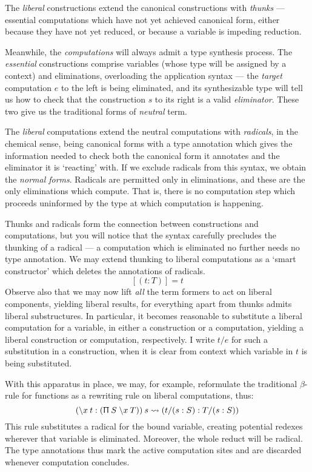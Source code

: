 \documentclass{jfp1}
\begin{document}
The \emph{liberal} constructions extend the canonical constructions
with \emph{thunks} --- essential computations which have not yet achieved canonical
form, either because they have not yet reduced, or because a variable
is impeding reduction.

Meanwhile, the \emph{computations} will always admit a type synthesis
process. The \emph{essential} constructions comprise variables (whose
type will be assigned by a context) and eliminations, overloading the
application syntax --- the \emph{target} computation $e$ to the left is being
eliminated, and its synthesizable
type will tell us how to check that the construction $s$ to its right
is a valid \emph{eliminator}. These two give us the traditional forms
of \emph{neutral} term.

The \emph{liberal} computations extend the neutral computations with
\emph{radicals}, in the chemical sense, being canonical forms with a
type annotation which gives the information needed to check both the
canonical form it annotates and the eliminator it is `reacting' with.
If we exclude radicals from this syntax, we obtain the \emph{normal
  forms}. Radicals are permitted only in eliminations, and these are
the only eliminations which compute. That is, there is no computation
step which proceeds uninformed by the type at which computation is
happening.

Thunks and radicals form the connection between constructions and
computations, but you will notice that the syntax carefully precludes
the thunking of a radical --- a computation which is eliminated no
further needs no type annotation. We may extend thunking to liberal
computations as a `smart constructor' which deletes the annotations
of radicals.
\[
  [(t:T)] = t
\]
Observe also that we may now lift
\emph{all} the term formers to act on liberal components, yielding
liberal results, for everything apart from thunks admits
liberal substructures. In particular, it becomes reasonable to
substitute a liberal computation for a variable, in either a
construction or a computation, yielding a liberal construction or
computation, respectively. I write $t/e$ for such a substitution
in a construction, when it is clear from context which variable in
$t$ is being substituted.

With this apparatus in place, we may, for example, reformulate the traditional
$\beta$-rule for functions as a rewriting rule on liberal
computations, thus:
\[
  (\backslash x\:t : (\Uppi\:S\;\backslash x\:{T}))\:s \rightsquigarrow (t/(s:S):T/(s:S))
\]
This rule substitutes a radical
for the bound variable, creating potential redexes wherever that
variable is eliminated. Moreover, the whole reduct will be radical. The type
annotations thus mark the active computation sites and are discarded
whenever computation concludes.
\end{document}
